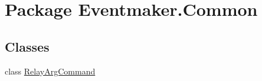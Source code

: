\hypertarget{namespace_eventmaker_1_1_common}{}\section{Package Eventmaker.\+Common}
\label{namespace_eventmaker_1_1_common}
\subsection*{Classes}
\begin{DoxyCompactItemize}
\item 
class \hyperlink{class_eventmaker_1_1_common_1_1_relay_arg_command}{Relay\+Arg\+Command}
\end{DoxyCompactItemize}
